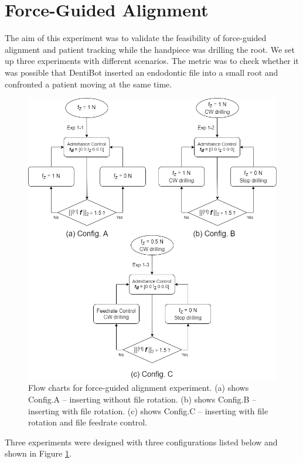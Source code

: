 \section{Force-Guided Alignment}
\hspace*{6mm}The aim of this experiment was to validate the feasibility of force-guided alignment and patient tracking while the handpiece was drilling the root. We set up three experiments with different scenarios. The metric was to check whether it was possible that DentiBot inserted an endodontic file into a small root and confronted a patient moving at the same time.
\begin{figure}[htbp]
\begin{center}
\includegraphics[width=1\linewidth]{Images/Exp1_motion planning.png}
\caption{Flow charts for force-guided alignment experiment. (a) shows Config.A -- inserting without file rotation. (b) shows Config.B --  inserting with file rotation. (c) shows Config.C --  inserting with file rotation and file feedrate control.}
\label{fig:exp_motion planning}
\end{center}
\end{figure}
\par	
Three experiments were designed with three configurations listed below and shown in Figure \ref{fig:exp_motion planning}.

